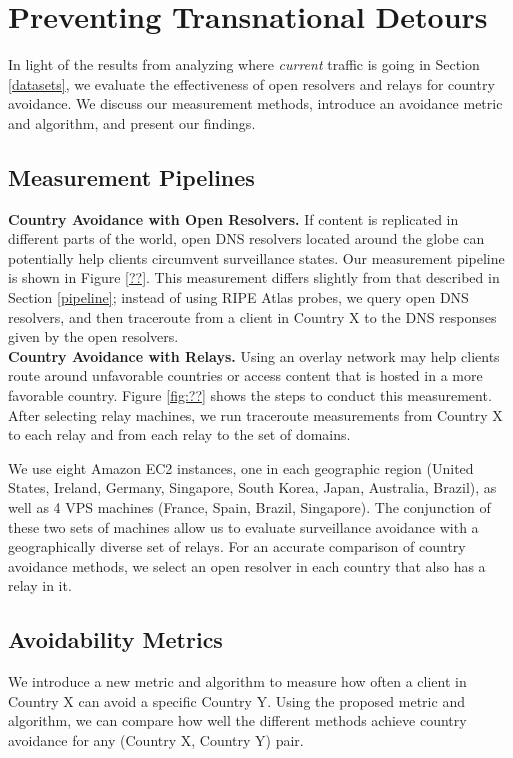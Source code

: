 \section{Preventing Transnational Detours}
\label{avoid_results}
In light of the results from analyzing where \textit{current} traffic is going in Section \ref{datasets}, we evaluate the effectiveness of open resolvers and relays for country avoidance.  We discuss our measurement methods, introduce an avoidance metric and algorithm, and present our findings.

\subsection{Measurement Pipelines}

{\bf Country Avoidance with Open Resolvers.} If content is replicated in different parts of the world, open DNS resolvers located around the globe can potentially help clients circumvent surveillance states.  Our measurement pipeline is shown in Figure \ref{??}.  This measurement differs slightly from that described in Section \ref{pipeline}; instead of using RIPE Atlas probes, we query open DNS resolvers, and then traceroute from a client in Country X to the DNS responses given by the open resolvers.
\\
{\bf Country Avoidance with Relays.} Using an overlay network may help clients route around unfavorable countries or access content that is hosted in a more favorable country.  Figure \ref{fig:??} shows the steps to conduct this measurement.  After selecting relay machines, we run traceroute measurements from Country X to each relay and from each relay to the set of domains. 

We use eight Amazon EC2 instances, one in each geographic region (United States, Ireland, Germany, Singapore, South Korea, Japan, Australia, Brazil), as well as 4 VPS machines (France, Spain, Brazil, Singapore).  The conjunction of these two sets of machines allow us to evaluate surveillance avoidance with a geographically diverse set of relays. For an accurate comparison of country avoidance methods, we select an open resolver in each country that also has a relay in it.

\subsection{Avoidability Metrics}
\label{metrics}
We introduce a new metric and algorithm to measure how often a client in Country X can avoid a specific Country Y.  Using the proposed metric and algorithm, we can compare how well the different methods achieve country avoidance for any (Country X, Country Y) pair.

